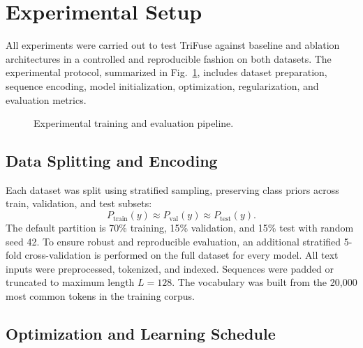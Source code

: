 \section{Experimental Setup}

All experiments were carried out to test TriFuse against baseline and ablation architectures in a controlled and reproducible fashion on both datasets. The experimental protocol, summarized in Fig.~\ref{fig:pipeline}, includes dataset preparation, sequence encoding, model initialization, optimization, regularization, and evaluation metrics.

\begin{figure}[!t]
\centering

\caption{Experimental training and evaluation pipeline.}
\label{fig:pipeline}
\end{figure}

\subsection{Data Splitting and Encoding}

Each dataset was split using stratified sampling, preserving class priors across train, validation, and test subsets:
\[
P_{\mathrm{train}}(y) \approx P_{\mathrm{val}}(y) \approx P_{\mathrm{test}}(y).
\]
The default partition is 70\% training, 15\% validation, and 15\% test with random seed 42. To ensure robust and reproducible evaluation, an additional stratified 5-fold cross-validation is performed on the full dataset for every model. All text inputs were preprocessed, tokenized, and indexed. Sequences were padded or truncated to maximum length $L=128$. The vocabulary was built from the 20{,}000 most common tokens in the training corpus.

\subsection{Optimization and Learning Schedule}

